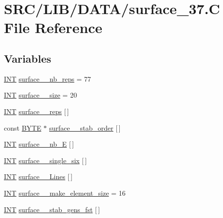 \hypertarget{surface__37_8_c}{}\section{S\+R\+C/\+L\+I\+B/\+D\+A\+T\+A/surface\+\_\+37.C File Reference}
\label{surface__37_8_c}
\subsection*{Variables}
\begin{DoxyCompactItemize}
\item 
\mbox{\hyperlink{galois_8h_a09fddde158a3a20bd2dcadb609de11dc}{I\+NT}} \mbox{\hyperlink{surface__37_8_c_a17e1e6e2a6e73789c119ebaa1f2c80a7}{surface\+\_\+\_\+nb\+\_\+reps}} = 77
\item 
\mbox{\hyperlink{galois_8h_a09fddde158a3a20bd2dcadb609de11dc}{I\+NT}} \mbox{\hyperlink{surface__37_8_c_aea7b3151703b97e7c1ecb137f356f18c}{surface\+\_\+\_\+size}} = 20
\item 
\mbox{\hyperlink{galois_8h_a09fddde158a3a20bd2dcadb609de11dc}{I\+NT}} \mbox{\hyperlink{surface__37_8_c_a3bdbbd288e5dd12ff5b388c4c0cbb552}{surface\+\_\+\_\+reps}} \mbox{[}$\,$\mbox{]}
\item 
const \mbox{\hyperlink{galois_8h_ab6cc7b4aeb6ea31aba2b3fbfc83ff5e6}{B\+Y\+TE}} $\ast$ \mbox{\hyperlink{surface__37_8_c_a00472492e7008e50e20f334a5b99a9ab}{surface\+\_\+\_\+stab\+\_\+order}} \mbox{[}$\,$\mbox{]}
\item 
\mbox{\hyperlink{galois_8h_a09fddde158a3a20bd2dcadb609de11dc}{I\+NT}} \mbox{\hyperlink{surface__37_8_c_a73cbc6eb9ade1729d78ed4439d451aa3}{surface\+\_\+\_\+nb\+\_\+E}} \mbox{[}$\,$\mbox{]}
\item 
\mbox{\hyperlink{galois_8h_a09fddde158a3a20bd2dcadb609de11dc}{I\+NT}} \mbox{\hyperlink{surface__37_8_c_a4b2923135ad5cd9fdb627840312bac42}{surface\+\_\+\_\+single\+\_\+six}} \mbox{[}$\,$\mbox{]}
\item 
\mbox{\hyperlink{galois_8h_a09fddde158a3a20bd2dcadb609de11dc}{I\+NT}} \mbox{\hyperlink{surface__37_8_c_a1cd21ddd050f5293393e32f39f2b2316}{surface\+\_\+\_\+\+Lines}} \mbox{[}$\,$\mbox{]}
\item 
\mbox{\hyperlink{galois_8h_a09fddde158a3a20bd2dcadb609de11dc}{I\+NT}} \mbox{\hyperlink{surface__37_8_c_a87e530d6c55e989d0a5f5beefbe03b41}{surface\+\_\+\_\+make\+\_\+element\+\_\+size}} = 16
\item 
\mbox{\hyperlink{galois_8h_a09fddde158a3a20bd2dcadb609de11dc}{I\+NT}} \mbox{\hyperlink{surface__37_8_c_a878ee223c061aead81222a42bf60c4f5}{surface\+\_\+\_\+stab\+\_\+gens\+\_\+fst}} \mbox{[}$\,$\mbox{]}

\end{DoxyCompactItemize}
